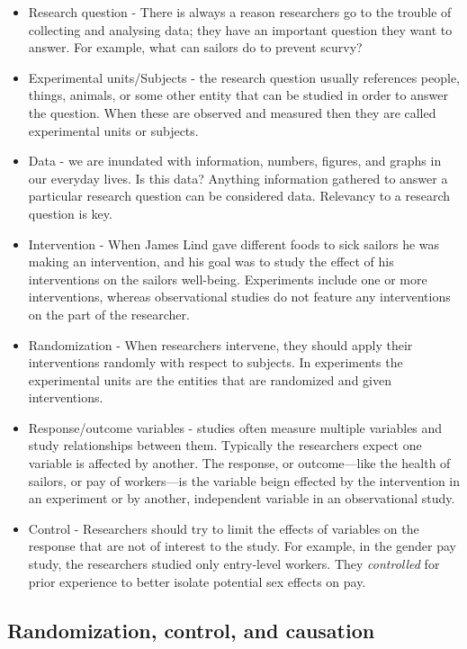 \documentclass[]{book}
\providecommand{\tightlist}{%
  \setlength{\itemsep}{0pt}\setlength{\parskip}{0pt}}
\begin{document}
\begin{itemize}
\tightlist
\item
  Research question - There is always a reason researchers go to the
  trouble of collecting and analysing data; they have an important
  question they want to answer. For example, what can sailors do to
  prevent scurvy?
\item
  Experimental units/Subjects - the research question usually references
  people, things, animals, or some other entity that can be studied in
  order to answer the question. When these are observed and measured
  then they are called experimental units or subjects.\\
\item
  Data - we are inundated with information, numbers, figures, and graphs
  in our everyday lives. Is this data? Anything information gathered to
  answer a particular research question can be considered data.
  Relevancy to a research question is key.\\
\item
  Intervention - When James Lind gave different foods to sick sailors he
  was making an intervention, and his goal was to study the effect of
  his interventions on the sailors well-being. Experiments include one
  or more interventions, whereas observational studies do not feature
  any interventions on the part of the researcher.
\item
  Randomization - When researchers intervene, they should apply their
  interventions randomly with respect to subjects. In experiments the
  experimental units are the entities that are randomized and given
  interventions.
\item
  Response/outcome variables - studies often measure multiple variables
  and study relationships between them. Typically the researchers expect
  one variable is affected by another. The response, or outcome---like
  the health of sailors, or pay of workers---is the variable beign
  effected by the intervention in an experiment or by another,
  independent variable in an observational study.
\item
  Control - Researchers should try to limit the effects of variables on
  the response that are not of interest to the study. For example, in
  the gender pay study, the researchers studied only entry-level
  workers. They \emph{controlled} for prior experience to better isolate
  potential sex effects on pay.
\end{itemize}

\subsection{Randomization, control, and
causation}\label{randomization-control-and-causation}
\end{document}

